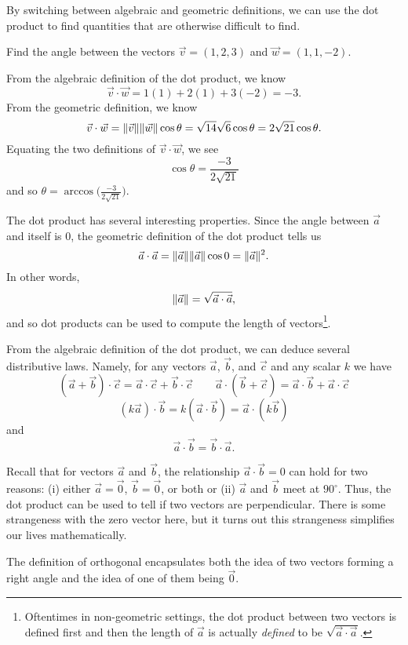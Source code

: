 By switching between algebraic and geometric definitions, we can use the dot
product to find quantities that are otherwise difficult to find.
\begin{example}
	Find the angle between the vectors $\vec v=(1,2,3)$ and $\vec w=(1,1,-2)$.

	From the algebraic definition of the dot product, we know
	\[
		\vec v\cdot \vec w = 1(1)+2(1)+3(-2) = -3.
	\]
	From the geometric definition, we know
	\[
		\vec v\cdot \vec w=\lVert\vec v\rVert\lVert\vec w\rVert\cos\theta
		=\sqrt{14}\sqrt{6}\cos\theta=2\sqrt{21}\cos\theta.
	\]
	Equating the two definitions of $\vec v\cdot \vec w$, we see
	\[
		\cos\theta = \frac{-3}{2\sqrt{21}}
	\]
	and so $\theta=\arccos\Big(\tfrac{-3}{2\sqrt{21}}\Big)$.
\end{example}

The dot product has several interesting properties. Since the angle between
$\vec a$ and itself is $0$, the geometric definition of the dot product tells us
\[
	\vec a\cdot \vec a=\lVert\vec a\rVert\lVert\vec a\rVert\cos 0 = \lVert\vec a\rVert^2.
\]
In other words,
\[
	\lVert\vec a\rVert=\sqrt{\vec a\cdot \vec a},
\]
and so dot products can be used to compute the length of vectors\footnote{ Oftentimes in
non-geometric settings, the dot product between two vectors is defined first and then
the length of $\vec a$ is actually \emph{defined} to be $\sqrt{\vec a\cdot \vec a}$.}.

From the algebraic definition of the dot product, we can deduce several distributive laws.
Namely, for any vectors $\vec a$, $\vec b$, and $\vec c$ and any scalar $k$ we have
\[
	(\vec a+\vec b)\cdot\vec c = \vec a\cdot \vec c+\vec b\cdot \vec c\qquad
	\vec a\cdot(\vec b+\vec c)=\vec a\cdot \vec b+\vec a\cdot \vec c
\]
\[
	(k\vec a)\cdot \vec b = k(\vec a\cdot \vec b)=\vec a\cdot (k\vec b)
\]
and
\[
	\vec a\cdot \vec b=\vec b\cdot \vec a.
\]

Recall that for vectors $\vec a$ and $\vec b$, the relationship $\vec a\cdot \vec b=0$
can hold for two reasons: (i) either $\vec a=\vec 0$, $\vec b=\vec 0$, or both
or (ii) $\vec a$ and $\vec b$ meet at $90^{\circ}$.  Thus, the dot product
can be used to tell if two vectors are perpendicular.  There is some strangeness
with the zero vector here, but it turns out this strangeness simplifies our lives
mathematically.


The definition of orthogonal encapsulates both the idea of two vectors forming
a right angle and the idea of one of them being $\vec 0$.

